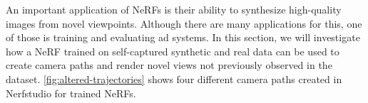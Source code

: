 An important application of NeRFs is their ability to synthesize high-quality images from novel viewpoints. Although there are many applications for this, one of those is training and evaluating \acrshort{ad} systems. In this section, we will investigate how a NeRF trained on self-captured synthetic and real data can be used to create camera paths and render novel views not previously observed in the dataset. \autoref{fig:altered-trajectories} shows four different camera paths created in Nerfstudio for trained NeRFs.



%
%





